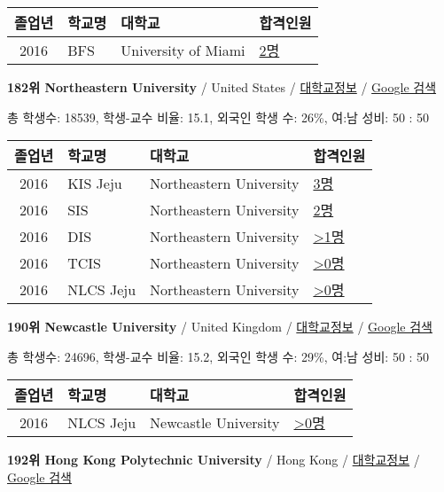 \documentclass[13pt,]{article}
\begin{document}
\begin{longtable}[]{@{}clll@{}}
\toprule
졸업년 & 학교명 & 대학교 & 합격인원\tabularnewline
\midrule
\endhead
2016 & BFS & University of Miami &
\href{http://cafe.naver.com/assarabia/11597}{2명}\tabularnewline
\bottomrule
\end{longtable}

\textbf{182위 Northeastern University} / United States /
\href{https://www.timeshighereducation.com/world-university-rankings/northeastern-university?ranking-dataset=589595}{대학교정보}
/ \href{http://www.google.com/search?q=Northeastern+University}{Google
검색}

총 학생수: 18539, 학생-교수 비율: 15.1, 외국인 학생 수: 26\%, 여:남
성비: 50 : 50

\begin{longtable}[]{@{}clll@{}}
\toprule
졸업년 & 학교명 & 대학교 & 합격인원\tabularnewline
\midrule
\endhead
2016 & KIS Jeju & Northeastern University &
\href{http://cafe.naver.com/assarabia/11596}{3명}\tabularnewline
2016 & SIS & Northeastern University &
\href{http://cafe.naver.com/assarabia/11589}{2명}\tabularnewline
2016 & DIS & Northeastern University &
\href{http://cafe.naver.com/assarabia/11591}{\textgreater{}1명}\tabularnewline
2016 & TCIS & Northeastern University &
\href{http://cafe.naver.com/assarabia/11598}{\textgreater{}0명}\tabularnewline
2016 & NLCS Jeju & Northeastern University &
\href{http://cafe.naver.com/assarabia/11592}{\textgreater{}0명}\tabularnewline
\bottomrule
\end{longtable}

\textbf{190위 Newcastle University} / United Kingdom /
\href{https://www.timeshighereducation.com/world-university-rankings/newcastle-university?ranking-dataset=589595}{대학교정보}
/ \href{http://www.google.com/search?q=Newcastle+University}{Google
검색}

총 학생수: 24696, 학생-교수 비율: 15.2, 외국인 학생 수: 29\%, 여:남
성비: 50 : 50

\begin{longtable}[]{@{}clll@{}}
\toprule
졸업년 & 학교명 & 대학교 & 합격인원\tabularnewline
\midrule
\endhead
2016 & NLCS Jeju & Newcastle University &
\href{http://cafe.naver.com/assarabia/11592}{\textgreater{}0명}\tabularnewline
\bottomrule
\end{longtable}

\textbf{192위 Hong Kong Polytechnic University} / Hong Kong /
\href{https://www.timeshighereducation.com/world-university-rankings/hong-kong-polytechnic-university?ranking-dataset=589595}{대학교정보}
/
\href{http://www.google.com/search?q=Hong+Kong+Polytechnic+University}{Google
검색}
\end{document}
